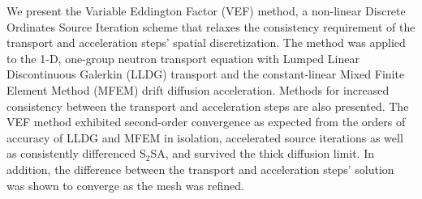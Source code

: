 We present the Variable Eddington Factor (VEF) method, a non-linear Discrete Ordinates Source Iteration scheme that relaxes the consistency requirement of the transport and acceleration steps' spatial discretization. The method was applied to the 1-D, one-group neutron transport equation with Lumped Linear Discontinuous Galerkin (LLDG) transport and the constant-linear Mixed Finite Element Method (MFEM) drift diffusion acceleration. Methods for increased consistency between the transport and acceleration steps are also presented. The VEF method exhibited second-order convergence as expected from the orders of accuracy of LLDG and MFEM in isolation, accelerated source iterations as well as consistently differenced S$_2$SA, and survived the thick diffusion limit. In addition, the difference between the transport and acceleration steps' solution was shown to converge as the mesh was refined. 